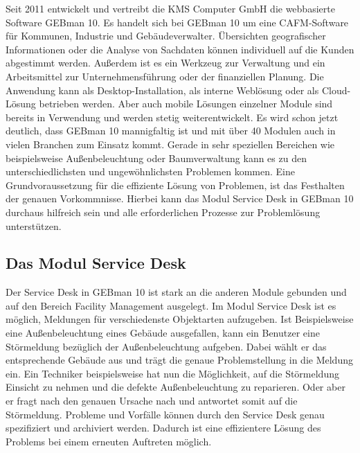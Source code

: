 \noindent
Seit 2011 entwickelt und vertreibt die KMS Computer GmbH die webbasierte Software GEBman 10. Es handelt sich bei GEBman 10 um eine CAFM-Software für Kommunen, Industrie und Gebäudeverwalter. Übersichten geografischer Informationen oder die Analyse von Sachdaten können individuell auf die Kunden abgestimmt werden. Außerdem ist es ein Werkzeug zur Verwaltung und ein Arbeitsmittel zur Unternehmensführung oder der finanziellen Planung. Die Anwendung kann als Desktop-Installation, als interne Weblösung oder als Cloud-Lösung betrieben werden. Aber auch mobile Lösungen einzelner Module sind bereits in Verwendung und werden stetig weiterentwickelt. Es wird schon jetzt deutlich, dass GEBman 10 mannigfaltig ist und mit über 40 Modulen auch in vielen Branchen zum Einsatz kommt. Gerade in sehr speziellen Bereichen wie beispielsweise Außenbeleuchtung oder Baumverwaltung kann es zu den unterschiedlichsten und ungewöhnlichsten Problemen kommen. Eine Grundvoraussetzung  für die effiziente Lösung von Problemen, ist das Festhalten der genauen Vorkommnisse. Hierbei kann das Modul Service Desk in GEBman 10 durchaus hilfreich sein und alle erforderlichen Prozesse zur Problemlösung unterstützen.



\subsection{Das Modul Service Desk}
\noindent
Der Service Desk in GEBman 10 ist stark an die anderen Module gebunden und auf den Bereich Facility Management ausgelegt. Im Modul Service Desk ist es möglich, Meldungen für verschiedenste Objektarten aufzugeben. Ist Beispielsweise eine Außenbeleuchtung eines Gebäude ausgefallen, kann ein Benutzer eine Störmeldung bezüglich der Außenbeleuchtung aufgeben. Dabei wählt er das entsprechende Gebäude aus und trägt die genaue Problemstellung in die Meldung ein. Ein Techniker beispielsweise hat nun die Möglichkeit, auf die Störmeldung Einsicht zu nehmen und die defekte Außenbeleuchtung zu reparieren. Oder aber er fragt nach den genauen Ursache nach und antwortet somit auf die Störmeldung. Probleme und Vorfälle können durch den Service Desk genau spezifiziert und archiviert werden. Dadurch ist eine effizientere Lösung des Problems bei einem erneuten Auftreten möglich.\\



